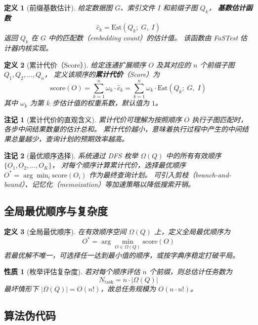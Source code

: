 \documentclass[12pt,a4paper]{article}
\newtheorem{definition}{定义}[section]
\newtheorem{property}{性质}[section]
\newtheorem{remark}{注记}[section]
\begin{document}
\begin{definition}[前缀基数估计]
\label{def:cardinality-estimate}
给定数据图 $G$、索引文件 $I$ 和前缀子图 $Q_k$，
\textbf{基数估计函数}
\[
  \hat{c}_k = \mathrm{Est}(Q_k;\; G,\; I)
\]
返回 $Q_k$ 在 $G$ 中的匹配数（embedding count）的估计值。
该函数由 FaSTest 估计器内核实现。
\end{definition}

\begin{definition}[累计代价（Score）]
\label{def:score}
给定连通扩展顺序 $O$ 及其对应的 $n$ 个前缀子图 $Q_1, Q_2, \dots, Q_n$，
定义该顺序的\textbf{累计代价}（Score）为
\[
  \mathrm{score}(O) = \sum_{k=1}^{n} \omega_k \cdot \hat{c}_k = \sum_{k=1}^{n} \omega_k \cdot \mathrm{Est}(Q_k;\; G,\; I)
\]
其中 $\omega_k$ 为第 $k$ 步估计值的权重系数，默认值为 $1$。
\end{definition}

\begin{remark}[累计代价的直观含义]
累计代价可理解为按照顺序 $O$ 执行子图匹配时，各步中间结果数量的估计总和。
累计代价越小，意味着执行过程中产生的中间结果总量越少，查询计划的预期效率越高。
\end{remark}

\begin{remark}[最优顺序选择]
系统通过 DFS 枚举 $\Omega(Q)$ 中的所有有效顺序 $\{O_1, O_2, \dots, O_K\}$，
对每个顺序计算累计代价，选择最优顺序
$O^* = \arg\min_{i} \mathrm{score}(O_i)$ 作为最终查询计划。
可引入剪枝（branch-and-bound）、记忆化（memoization）等加速策略以降低搜索开销。
\end{remark}

\subsection{全局最优顺序与复杂度}
\label{sec:formal-optimal}

\begin{definition}[全局最优顺序]
在有效顺序空间 $\Omega(Q)$ 上，定义全局最优顺序为
\[
O^*=\arg\min_{O\in\Omega(Q)}\mathrm{score}(O)
\]
若最优解不唯一，可选择任一达到最小值的顺序，或按字典序稳定打破平局。
\end{definition}

\begin{property}[枚举评估复杂度]
若对每个顺序评估 $n$ 个前缀，则总估计任务数为
\[
N_{\text{task}} = n\cdot |\Omega(Q)|
\]
最坏情形下 $|\Omega(Q)|=O(n!)$，故总任务规模为 $O(n\cdot n!)$。
\end{property}

\subsection{算法伪代码}
\label{sec:formal-pseudocode}
\end{document}
